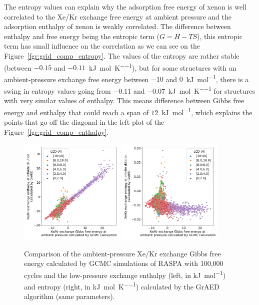 \documentclass[main]{subfiles}
\begin{document}
The entropy values can explain why the adsorption free energy of xenon is well correlated to the Xe/Kr exchange free energy at ambient pressure and the adsorption enthalpy of xenon is weakly correlated. The difference between enthalpy and free energy being the entropic term ($G=H-TS$), this entropic term has small influence on the correlation as we can see on the Figure~\ref{fgr:grid_comp_entropy}. The values of the entropy are rather stable (between $-0.15$ and $-0.11$~\si{\kilo\joule\per\mole\per\kelvin}), but for some structures with an ambient-pressure exchange free energy between $-10$ and $0$~\si{\kilo\joule\per\mole}, there is a swing in entropy values going from $-0.11$ and $-0.07$~\si{\kilo\joule\per\mole\per\kelvin} for structures with very similar values of enthalpy. This means difference between Gibbs free energy and enthalpy that could reach a span of $12$~\si{\kilo\joule\per\mole}, which explains the points that go off the diagonal in the left plot of the Figure~\ref{fgr:grid_comp_enthalpy}.

\begin{figure}[ht]
  \centering
    \includegraphics[width=0.45\textwidth]{figures/3-fastsim/G_2080_vs_H_grid_overview.jpg}
    \includegraphics[width=0.45\textwidth]{figures/3-fastsim/G_2080_vs_S_grid_overview.jpg}
    \caption{Comparison of the ambient-pressure Xe/Kr exchange Gibbs free energy calculated by GCMC simulations of RASPA with 100,000 cycles and the low-pressure exchange enthalpy (left, in \si{\kilo\joule\per\mole}) and entropy (right, in \si{\kilo\joule\per\mole\per\kelvin}) calculated by the GrAED algorithm (same parameters).}\label{fgr:grid_comp_exc}
\end{figure}
\end{document}
